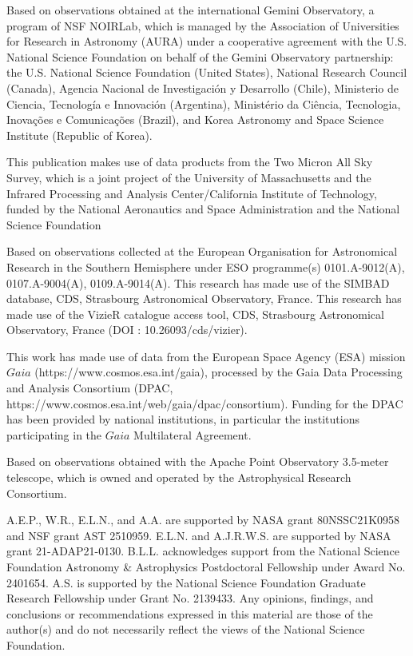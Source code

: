 \documentclass[]{aastex701} %
\begin{document}
\begin{acknowledgments}

Based on observations obtained at the international Gemini Observatory, a program of NSF NOIRLab, which is managed by the Association of Universities for Research in Astronomy (AURA) under a cooperative agreement with the U.S. National Science Foundation on behalf of the Gemini Observatory partnership: the U.S. National Science Foundation (United States), National Research Council (Canada), Agencia Nacional de Investigación y Desarrollo (Chile), Ministerio de Ciencia, Tecnología e Innovación (Argentina), Ministério da Ciência, Tecnologia, Inovações e Comunicações (Brazil), and Korea Astronomy and Space Science Institute (Republic of Korea).

This publication makes use of data products from the Two Micron All Sky Survey, which is a joint project of the University of Massachusetts and the Infrared Processing and Analysis Center/California Institute of Technology, funded by the National Aeronautics and Space Administration and the National Science Foundation

Based on observations collected at the European Organisation for Astronomical Research in the Southern Hemisphere under ESO programme(s) 0101.A-9012(A), 0107.A-9004(A), 0109.A-9014(A). This research has made use of the SIMBAD database, CDS, Strasbourg Astronomical Observatory, France. This research has made use of the VizieR catalogue access tool, CDS, Strasbourg Astronomical Observatory, France (DOI : 10.26093/cds/vizier).

This work has made use of data from the European Space Agency (ESA) mission $Gaia$
(https://www.cosmos.esa.int/gaia), processed by the Gaia Data Processing and Analysis Consortium (DPAC, https://www.cosmos.esa.int/web/gaia/dpac/consortium). Funding for the DPAC has been
provided by national institutions, in particular the institutions participating in the $Gaia$ Multilateral Agreement.

Based on observations obtained with the Apache Point Observatory 3.5-meter telescope, which is owned and operated by the Astrophysical Research Consortium.

A.E.P., W.R., E.L.N., and A.A. are supported by NASA grant 80NSSC21K0958 and NSF grant AST 2510959. E.L.N. and A.J.R.W.S. are supported by NASA grant 21-ADAP21-0130. B.L.L. acknowledges support from the National Science Foundation Astronomy \& Astrophysics Postdoctoral Fellowship under Award No. 2401654. A.S. is supported by the National Science Foundation Graduate Research Fellowship under Grant No. 2139433. Any opinions, findings, and conclusions or recommendations expressed in this material are those of the author(s) and do not necessarily reflect the views of the National Science Foundation. 

\end{acknowledgments}
\end{document}
